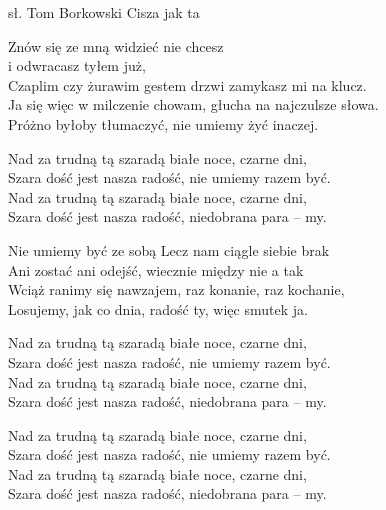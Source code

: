 {sł. Tom Borkowski}
{Cisza jak ta}
\begin{textn}

Znów się ze mną widzieć nie chcesz \ifOneCol \else \\ \vin \vin \vin \vin \fi i odwracasz tyłem już,\\
Czaplim czy żurawim gestem drzwi zamykasz mi na klucz.\\
Ja się więc w milczenie chowam, głucha na najczulsze słowa.\\
Próżno byłoby tłumaczyć, nie umiemy żyć inaczej.

    \OneColVin Nad za trudną tą szaradą białe noce, czarne dni,\\
    \OneColVin Szara dość jest nasza radość, nie umiemy razem być.\\
    \OneColVin Nad za trudną tą szaradą białe noce, czarne dni,\\
    \OneColVin Szara dość jest nasza radość, niedobrana para – my.

    \hfill\break
Nie umiemy być ze sobą Lecz nam ciągle siebie brak\\
Ani zostać ani odejść, wiecznie między nie a tak\\
Wciąż ranimy się nawzajem, raz konanie, raz kochanie,\\
Losujemy, jak co dnia, radość ty, więc smutek ja.

    \OneColVin Nad za trudną tą szaradą białe noce, czarne dni,\\
    \OneColVin Szara dość jest nasza radość, nie umiemy razem być.\\
    \OneColVin Nad za trudną tą szaradą białe noce, czarne dni,\\
    \OneColVin Szara dość jest nasza radość, niedobrana para – my.

    \hfill\break
    \OneColVin Nad za trudną tą szaradą białe noce, czarne dni,\\
    \OneColVin Szara dość jest nasza radość, nie umiemy razem być.\\
    \OneColVin Nad za trudną tą szaradą białe noce, czarne dni,\\
    \OneColVin Szara dość jest nasza radość, niedobrana para – my.

\end{textn}
